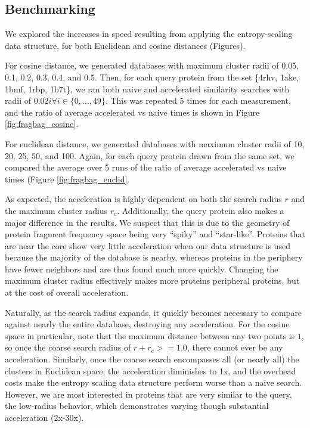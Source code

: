\documentclass{amsbook}
\theoremstyle{definition}
\theoremstyle{remark}
\numberwithin{equation}{section}
\begin{document}
\subsection*{Benchmarking}
We explored the increases in speed resulting from applying the entropy-scaling data structure, for both Euclidean and cosine distances (Figures).

For cosine distance, we generated databases with maximum cluster radii of 0.05, 0.1, 0.2, 0.3, 0.4, and 0.5.
Then, for each query protein from the set \{4rhv, 1ake, 1bmf, 1rbp, 1b7t\}, we ran both naive and accelerated similarity searches with radii of $0.02i \forall i \in \{0,\ldots,49\}$.
This was repeated 5 times for each measurement, and the ratio of average accelerated vs naive times is shown in Figure \ref{fig:fragbag_cosine}.

For euclidean distance, we generated databases with maximum cluster radii of 10, 20, 25, 50, and 100.
Again, for each query protein drawn from the same set, we compared the average over 5 runs of the ratio of average accelerated vs naive times (Figure \ref{fig:fragbag_euclid}.

As expected, the acceleration is highly dependent on both the search radius $r$ and the maximum cluster radius $r_c$.
Additionally, the query protein also makes a major difference in the results.
We suspect that this is due to the geometry of protein fragment frequency space being very ``spiky'' and ``star-like''.
Proteins that are near the core show very little acceleration when our data structure is used because the majority of the database is nearby, whereas proteins in the periphery have fewer neighbors and are thus found much more quickly.
Changing the maximum cluster radius effectively makes more proteins peripheral proteins, but at the cost of overall acceleration.

Naturally, as the search radius expands, it quickly becomes necessary to compare against nearly the entire database, destroying any acceleration.
For the cosine space in particular, note that the maximum distance between any two points is $1$, so once the coarse search radius of $r+r_c >= 1.0$, there cannot ever be any acceleration.
Similarly, once the coarse search encompasses all (or nearly all) the clusters in Euclidean space, the acceleration diminishes to 1x, and the overhead costs make the entropy scaling data structure perform worse than a naive search.
However, we are most interested in proteins that are very similar to the query, the low-radius behavior, which demonstrates varying though substantial acceleration (2x-30x).
\end{document}
